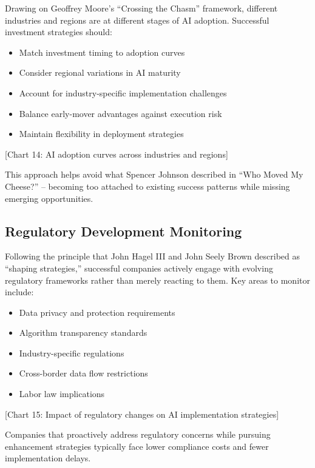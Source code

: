 \documentclass[
  Letterpaper,
]{scrbook}
\providecommand{\tightlist}{%
  \setlength{\itemsep}{0pt}\setlength{\parskip}{0pt}}\usepackage{longtable,booktabs,array}
\begin{document}
Drawing on Geoffrey Moore's ``Crossing the Chasm'' framework, different
industries and regions are at different stages of AI adoption.
Successful investment strategies should:

\begin{itemize}
\tightlist
\item
  Match investment timing to adoption curves
\item
  Consider regional variations in AI maturity
\item
  Account for industry-specific implementation challenges
\item
  Balance early-mover advantages against execution risk
\item
  Maintain flexibility in deployment strategies
\end{itemize}

{[}Chart 14: AI adoption curves across industries and regions{]}

This approach helps avoid what Spencer Johnson described in ``Who Moved
My Cheese?'' -- becoming too attached to existing success patterns while
missing emerging opportunities.

\subsection{Regulatory Development
Monitoring}\label{regulatory-development-monitoring}

Following the principle that John Hagel III and John Seely Brown
described as ``shaping strategies,'' successful companies actively
engage with evolving regulatory frameworks rather than merely reacting
to them. Key areas to monitor include:

\begin{itemize}
\tightlist
\item
  Data privacy and protection requirements
\item
  Algorithm transparency standards
\item
  Industry-specific regulations
\item
  Cross-border data flow restrictions
\item
  Labor law implications
\end{itemize}

{[}Chart 15: Impact of regulatory changes on AI implementation
strategies{]}

Companies that proactively address regulatory concerns while pursuing
enhancement strategies typically face lower compliance costs and fewer
implementation delays.
\end{document}
